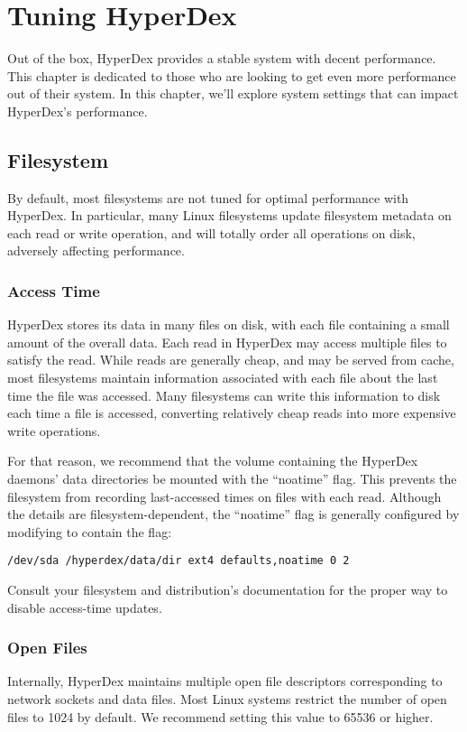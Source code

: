 \chapter{Tuning HyperDex}
\label{chap:tuning}

Out of the box, HyperDex provides a stable system with decent performance.  This
chapter is dedicated to those who are looking to get even more performance out
of their system.  In this chapter, we'll explore system settings that can impact
HyperDex's performance.

\section{Filesystem}
\label{sec:tuning:filesystem}

By default, most filesystems are not tuned for optimal performance with
HyperDex.  In particular, many Linux filesystems update filesystem metadata
on each read or write operation, and will totally order all operations on disk,
adversely affecting performance.

\subsection{Access Time}
\label{sec:tuning:atime}

HyperDex stores its data in many files on disk, with each file containing a
small amount of the overall data.  Each read in HyperDex may access multiple
files to satisfy the read.  While reads are generally cheap, and may be served
from cache, most filesystems maintain information associated with each file
about the last time the file was accessed.  Many filesystems can write this
information to disk each time a file is accessed, converting relatively cheap
reads into more expensive write operations.

For that reason, we recommend that the volume containing the HyperDex daemons'
data directories be mounted with the ``noatime'' flag.  This prevents the
filesystem from recording last-accessed times on files with each read.  Although
the details are filesystem-dependent, the ``noatime'' flag is generally
configured by modifying  to contain the flag:

\begin{verbatim}
/dev/sda /hyperdex/data/dir ext4 defaults,noatime 0 2
\end{verbatim}

Consult your filesystem and distribution's documentation for the proper way to
disable access-time updates.

\subsection{Open Files}
\label{sec:tuning:ulimit-n}

Internally, HyperDex maintains multiple open file descriptors corresponding to
network sockets and data files.  Most Linux systems restrict the number of open
files to 1024 by default.  We recommend setting this value to 65536 or higher.
